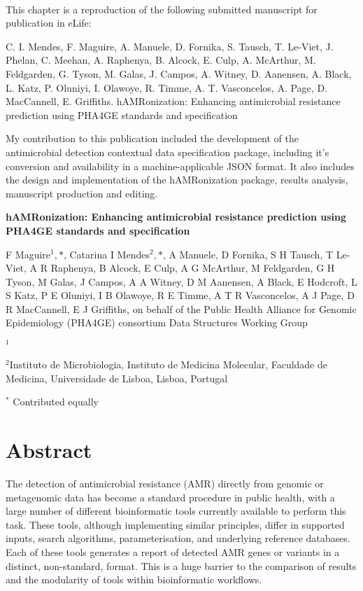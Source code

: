 \mbox{}\\
\vspace{8cm}


This chapter is a reproduction of the following submitted manuscript for publication in eLife:

C. I. Mendes, F. Maguire, A. Manuele, D. Fornika, S. Tausch, T. Le-Viet, J. Phelan, C. Meehan, A. Raphenya, B. Alcock, E. Culp, A. McArthur, M. Feldgarden, G. Tyson, M. Galas, J. Campos, A. Witney, D. Aanensen, A. Black, L. Katz, P. Oluniyi, I. Olawoye, R. Timme, A. T. Vasconcelos, A. Page, D. MacCannell, E. Griffiths. 
hAMRonization: Enhancing antimicrobial resistance prediction using PHA4GE standards and specification

My contribution to this publication included the development of the antimicrobial detection contextual data specification package, including it’s conversion and availability in a machine-applicable JSON format. It also includes the design and implementation of the hAMRonization package, results analysis, manuscript production and editing. 

\cleardoublepage 

\begin{center}
\large
\textbf{hAMRonization: Enhancing antimicrobial resistance  prediction using PHA4GE standards and specification}
\end{center}

F Maguire$^1,*$,
Catarina I Mendes$^2,*$, 
A Manuele, 
D Fornika, 
S H Tausch, 
T Le-Viet, 
A R Raphenya, 
B Alcock, 
E Culp, 
A G McArthur, 
M Feldgarden, 
G H Tyson, 
M Galas, 
J Campos, 
A A Witney, 
D M Aanensen, 
A Black, 
E Hodcroft, 
L S Katz, 
P E Oluniyi, 
I B Olawoye, 
R E Timme, 
A T R Vasconcelos, 
A J Page, 
D R MacCannell, 
E J Griffiths, 
on behalf of the Public Health Alliance for Genomic Epidemiology (PHA4GE) consortium Data Structures Working Group

$^1$ 

$^2$Instituto de Microbiologia, Instituto de Medicina Molecular, Faculdade de Medicina, Universidade de Lisboa, Lisboa, Portugal 

$^*$ Contributed equally 

\section{Abstract}

The detection of antimicrobial resistance (AMR) directly from genomic or metagenomic data has become a standard procedure in public health, with a large number of different bioinformatic tools currently available to perform this task. These tools, although implementing similar principles, differ in supported inputs, search algorithms, parameterisation, and underlying reference databases. Each of these tools generates a report of detected AMR genes or variants in a distinct, non-standard, format. This is a huge barrier to the comparison of results and the modularity of tools within bioinformatic workflows. 

